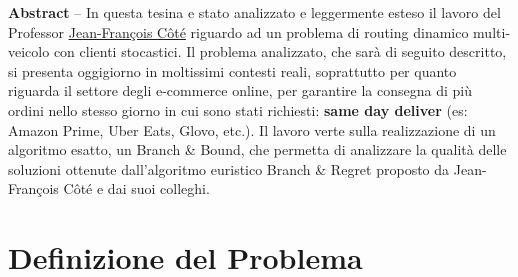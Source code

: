 \documentclass[
    article,            %
    12pt,                %
    oneside,            %
    a4paper,            %
    english,            %
    italian,                %
    sumario=tradicional,
]{abntex2}
\title{\LARGE \centering {\textbf{The dynamic vehicle routing problem with stochastic customer requests and multiple delivery routes}}}
\author{Lorenzo Sciandra,\and Stefano Vittorio Porta, \and Jean-François Côté}
\begin{document}
    \textual

    \pagestyle{meuestilo}

    \frenchspacing

    \maketitle


    \begin{changemargin}{1cm}{1cm}
        \textbf{Abstract} – In questa tesina e stato analizzato e leggermente esteso il lavoro del Professor \href{https://www4.fsa.ulaval.ca/enseignant/jean-francois-cote/}{Jean-François Côté} riguardo ad un problema di routing dinamico multi-veicolo con clienti stocastici. Il problema analizzato, che sarà di seguito descritto, si presenta oggigiorno in moltissimi contesti reali, soprattutto per quanto riguarda il settore degli e-commerce online, per garantire la consegna di più ordini nello stesso giorno in cui sono stati richiesti: \textbf{same day deliver} (es: Amazon Prime, Uber Eats, Glovo, etc.). Il lavoro verte sulla realizzazione di un algoritmo esatto, un Branch \& Bound, che permetta di analizzare la qualità delle soluzioni ottenute dall'algoritmo euristico Branch \& Regret proposto da Jean-François Côté e dai suoi colleghi. 
        \vspace{\onelineskip}

        \noindent
    \end{changemargin}


\hypertarget{definizione-del-problema}{%
\section{Definizione del Problema}\label{definizione-del-problema}}
\end{document}

